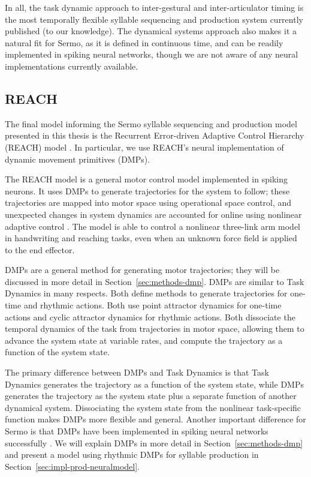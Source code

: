 In all, the task dynamic approach
to inter-gestural and inter-articulator timing
is the most temporally flexible
syllable sequencing and production system
currently published
(to our knowledge).
The dynamical systems approach
also makes it a natural fit for Sermo,
as it is defined in continuous time,
and can be readily implemented
in spiking neural networks,
though we are not aware of any
neural implementations currently available.

\subsection{REACH}

The final model informing
the Sermo syllable sequencing
and production model presented
in this thesis is the
Recurrent Error-driven Adaptive Control Hierarchy (REACH)
model \citep{dewolf2015}.
In particular, we use REACH's
neural implementation
of dynamic movement primitives (DMPs).

The REACH model is a general motor control
model implemented in spiking neurons.
It uses DMPs  to generate trajectories
for the system to follow;
these trajectories are mapped into
motor space using operational space control,
and unexpected changes in system dynamics
are accounted for online
using nonlinear adaptive control
\citep{slotine1987}.
The model is able to control
a nonlinear three-link arm model
in handwriting and reaching tasks,
even when an unknown force field
is applied to the end effector.

DMPs are a general method for generating motor trajectories;
they will be discussed in more detail
in Section~\ref{sec:methods-dmp}.
DMPs are similar to Task Dynamics in many respects.
Both define methods to generate trajectories
for one-time and rhythmic actions.
Both use point attractor dynamics
for one-time actions
and cyclic attractor dynamics
for rhythmic actions.
Both dissociate the temporal dynamics
of the task from trajectories
in motor space,
allowing them to advance the system state
at variable rates,
and compute the trajectory
as a function of the system state.

The primary difference between DMPs and Task Dynamics
is that Task Dynamics generates
the trajectory as a function
of the system state,
while DMPs generates the trajectory
as the system state
plus a separate function
of another dynamical system.
Dissociating the system state
from the nonlinear task-specific function
makes DMPs more flexible and general.
Another important difference for Sermo
is that DMPs have been implemented
in spiking neural networks successfully
\citep{dewolf2015}.
We will explain DMPs in more detail
in Section~\ref{sec:methods-dmp} and present a model
using rhythmic DMPs for syllable production
in Section~\ref{sec:impl-prod-neuralmodel}.

